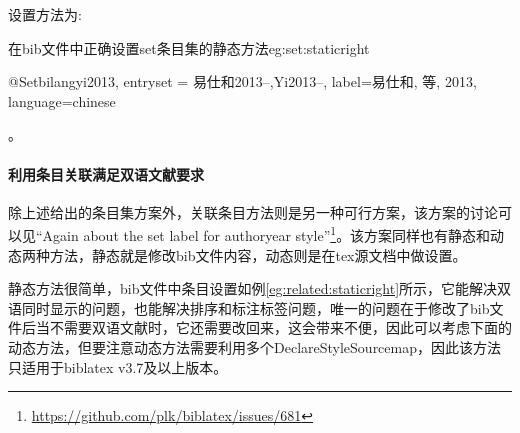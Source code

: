 
设置方法为:

\begin{example}{在bib文件中正确设置set条目集的静态方法}{eg:set:staticright}
\begin{texlist}
@Set{bilangyi2013,
entryset = {易仕和2013--,Yi2013--},
label={易仕和, 等, 2013},
language={chinese}
}
\end{texlist}
\end{example}

。

\paragraph{利用条目关联满足双语文献要求}

除上述给出的条目集方案外，关联条目方法则是另一种可行方案，该方案的讨论可以见“Again about the \@ set label for authoryear style”\footnote{\url{https://github.com/plk/biblatex/issues/681}}。该方案同样也有静态和动态两种方法，静态就是修改bib文件内容，动态则是在tex源文档中做设置。

静态方法很简单，bib文件中条目设置如例\ref{eg:related:staticright}所示，它能解决双语同时显示的问题，也能解决排序和标注标签问题，唯一的问题在于修改了bib文件后当不需要双语文献时，它还需要改回来，这会带来不便，因此可以考虑下面的动态方法，但要注意动态方法需要利用多个DeclareStyleSourcemap，因此该方法只适用于biblatex v3.7及以上版本。

